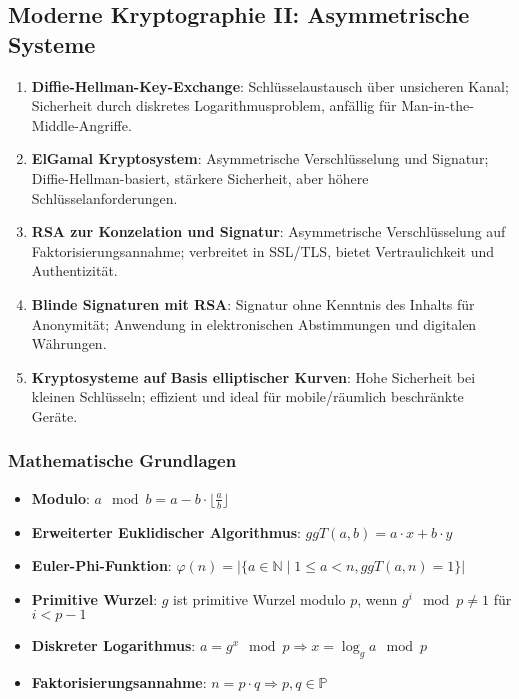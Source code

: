 \documentclass{article}
\begin{document}
\subsection{Moderne Kryptographie II: Asymmetrische Systeme}
\begin{enumerate}
  \item \textbf{Diffie-Hellman-Key-Exchange}: Schlüsselaustausch über unsicheren Kanal; Sicherheit durch diskretes Logarithmusproblem, anfällig für Man-in-the-Middle-Angriffe.
  \item \textbf{ElGamal Kryptosystem}: Asymmetrische Verschlüsselung und Signatur; Diffie-Hellman-basiert, stärkere Sicherheit, aber höhere Schlüsselanforderungen.
  \item \textbf{RSA zur Konzelation und Signatur}: Asymmetrische Verschlüsselung auf Faktorisierungsannahme; verbreitet in SSL/TLS, bietet Vertraulichkeit und Authentizität.
  \item \textbf{Blinde Signaturen mit RSA}: Signatur ohne Kenntnis des Inhalts für Anonymität; Anwendung in elektronischen Abstimmungen und digitalen Währungen.
  \item \textbf{Kryptosysteme auf Basis elliptischer Kurven}: Hohe Sicherheit bei kleinen Schlüsseln; effizient und ideal für mobile/räumlich beschränkte Geräte.
\end{enumerate}

\subsubsection{Mathematische Grundlagen}
\begin{itemize}
  \item \textbf{Modulo}: $a \mod b = a - b \cdot \lfloor \frac{a}{b} \rfloor$
  \item \textbf{Erweiterter Euklidischer Algorithmus}: $ggT(a, b) = a \cdot x + b \cdot y$
  \item \textbf{Euler-Phi-Funktion}: $\varphi(n) = |\{a \in \mathbb{N} \mid 1 \leq a < n, ggT(a, n) = 1\}|$
  \item \textbf{Primitive Wurzel}: $g$ ist primitive Wurzel modulo $p$, wenn $g^i \mod p \neq 1$ für $i < p-1$
  \item \textbf{Diskreter Logarithmus}: $a = g^x \mod p \Rightarrow x = \log_g a \mod p$
  \item \textbf{Faktorisierungsannahme}: $n = p \cdot q \Rightarrow p, q \in \mathbb{P}$
\end{itemize}
\end{document}

